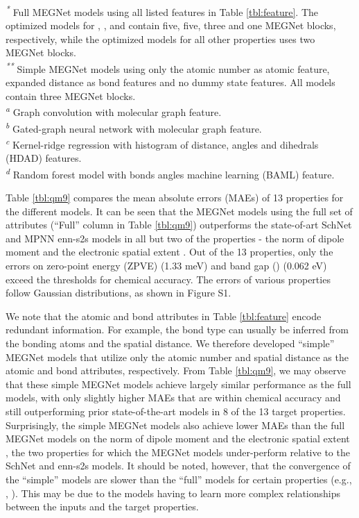 \documentclass[manuscript=article]{achemso}
\begin{document}
\begin{table}
\begin{flushleft}
   \textsuperscript{\emph{*}} Full MEGNet models using all listed features in Table \ref{tbl:feature}. The optimized models for , ,  and  contain five, five, three and one MEGNet blocks, respectively, while the optimized models for all other properties uses two MEGNet blocks.\\
   \textsuperscript{\emph{**}} Simple MEGNet models using only the atomic number as atomic feature, expanded distance as bond features and no dummy state features. All models contain three MEGNet blocks. \\ 
  \textsuperscript{\emph{a}} Graph convolution with molecular graph feature\cite{Kearnes2016a}.\\
  \textsuperscript{\emph{b}} Gated-graph neural network with molecular graph feature\cite{li2015gated}. \\
  \textsuperscript{\emph{c}} Kernel-ridge regression with histogram of distance, angles and dihedrals (HDAD) features.\\
  \textsuperscript{\emph{d}} Random forest model with bonds angles machine learning (BAML) feature.
  \end{flushleft}
  
\end{table}

Table \ref{tbl:qm9} compares the mean absolute errors (MAEs) of 13 properties for the different models. It can be seen that the MEGNet models using the full set of attributes (``Full'' column in Table \ref{tbl:qm9}) outperforms the state-of-art SchNet\cite{Schutt2018} and MPNN enn-s2s models\cite{gilmer2017neural} in all but two of the properties - the norm of dipole moment  and the electronic spatial extent . Out of the 13 properties, only the errors on zero-point energy (ZPVE) (1.33 meV) and band gap () (0.062 eV) exceed the thresholds for chemical accuracy. The errors of various properties follow Gaussian distributions, as shown in Figure S1.

We note that the atomic and bond attributes in Table \ref{tbl:feature} encode redundant information. For example, the bond type can usually be inferred from the bonding atoms and the spatial distance. We therefore developed ``simple'' MEGNet models that utilize only the atomic number and spatial distance as the atomic and bond attributes, respectively. From Table \ref{tbl:qm9}, we may observe that these simple MEGNet models achieve largely similar performance as the full models, with only slightly higher MAEs that are within chemical accuracy and still outperforming prior state-of-the-art models in 8 of the 13 target properties. Surprisingly, the simple MEGNet models also achieve lower MAEs than the full MEGNet models on the norm of dipole moment  and the electronic spatial extent , the two properties for which the MEGNet models under-perform relative to the SchNet and enn-s2s models. It should be noted, however, that the convergence of the ``simple'' models are slower than the ``full'' models for certain properties (e.g., , ). This may be due to the models having to learn more complex relationships between the inputs and the target properties. 
\end{document}
